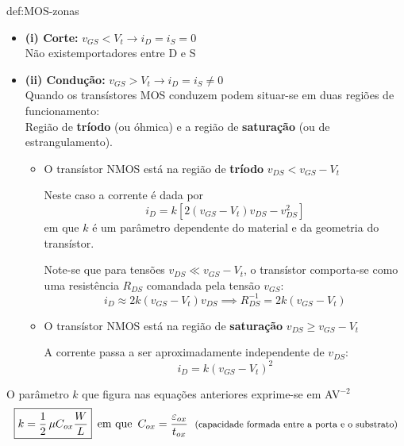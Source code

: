 \begin{theo}{def:MOS-zonas}\label{def:MOS-zonas}
    \begin{itemize}[leftmargin=*]
        \item[] \textbf{(i) Corte:} \hfill $\boxed{ v_{GS} < V_t \rightarrow i_D = i_S = 0}$ \\[1pt]
        Não existem\footnotemark[8] portadores entre D e S
        
        \item[] \textbf{(ii) Condução:} \hfill $\boxed{ v_{GS} > V_t \rightarrow i_D = i_S \neq 0}$ \\[1pt]
        Quando os transístores MOS conduzem podem situar-se em duas regiões de funcionamento: \\
        Região de \textbf{tríodo} (ou óhmica) e a região de \textbf{saturação} (ou de estrangulamento).
        
        \begin{itemize}[label=\rule{0.9ex}{0.9ex}]
            \item O transístor NMOS está na região de \textbf{tríodo} \hfill $\boxed{ v_{DS} < v_{GS} - V_t }$

            Neste caso a corrente é dada por
            $$
                \boxed{ i_D = k\left[ 2(v_{GS} - V_t)v_{DS} - v_{DS}^2 \right] }
            $$
            em que $k$ é um parâmetro dependente do material e da geometria do transístor.

            Note-se que para tensões $v_{DS} \ll v_{GS} - V_t$, o transístor comporta-se como uma resistência $R_{DS}$ comandada pela tensão $v_{GS}$:
            $$
                i_D \approx 2k(v_{GS} - V_t)v_{DS} \implies R^{-1}_{DS} = 2k(v_{GS} - V_t)
            $$

            \item O transístor NMOS está na região de \textbf{saturação} \hfill $\boxed{ v_{DS} \ge v_{GS} - V_t }$

            A corrente passa a ser aproximadamente independente de $v_{DS}$:
            $$
                \boxed{ i_D = k\left( v_{GS} - V_t \right)^2 }
            $$
        \end{itemize}
        
    \end{itemize}
\end{theo}
      
\noindent O parâmetro $k$ que figura nas equações anteriores exprime-se em AV$^{-2}$
$$
    \boxed{ k = \frac{1}{2}\, \mu C_{ox} \frac{W}{L} } \;\: \text{em que }\, C_{ox} = \frac{\varepsilon_{ox}}{t_{ox}}\; \text{\footnotesize (capacidade formada entre a porta e o substrato)}
$$

